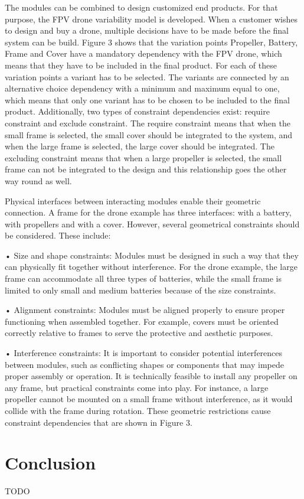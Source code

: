 \documentclass[sigconf,review]{acmart}
\begin{document}
The modules can be combined to design customized end products.  For that purpose, the FPV drone variability model is developed. 
When a customer wishes to design and buy a drone, multiple decisions have to be made before the final system can be build. 
Figure 3 shows that the variation points Propeller, Battery, Frame and Cover have a mandatory dependency with the FPV drone, which means that they have to be included in the final product. 
For each of these variation points a variant has to be selected. The variants are connected by an alternative choice dependency with a minimum and maximum equal to one, which means that only one variant has to be chosen to be included to the final product. 
Additionally, two types of constraint dependencies exist: require constraint and exclude constraint. The require constraint means that when the small frame is selected, the small cover should be integrated to the system, and when the large frame is selected, the large cover should be integrated. 
The excluding constraint means that when a large propeller is selected, the small frame can not be integrated to the design and this relationship goes the other way round as well.


Physical interfaces between interacting modules enable their geometric connection. A frame for the drone example has three interfaces: with a battery, with propellers and with a cover. 
However, several geometrical constraints should be considered. These include:

•	Size and shape constraints: Modules must be designed in such a way that they can physically fit together without interference. 
For the drone example, the large frame can accommodate all three types of batteries, while the small frame is limited to only small and medium batteries because of the size constraints.

•	Alignment constraints: Modules must be aligned properly to ensure proper functioning when assembled together. 
For example, covers must be oriented correctly relative to frames to serve the protective and aesthetic purposes. 

•	Interference constraints: It is important to consider potential interferences between modules, such as conflicting shapes or components that may impede proper assembly or operation. 
It is technically feasible to install any propeller on any frame, but practical constraints come into play. For instance, a large propeller cannot be mounted on a small frame without interference, as it would collide with the frame during rotation.
These geometric restrictions cause constraint dependencies that are shown in Figure 3.


\section{Conclusion}
\label{sec:conclusion}

TODO



\end{document}
